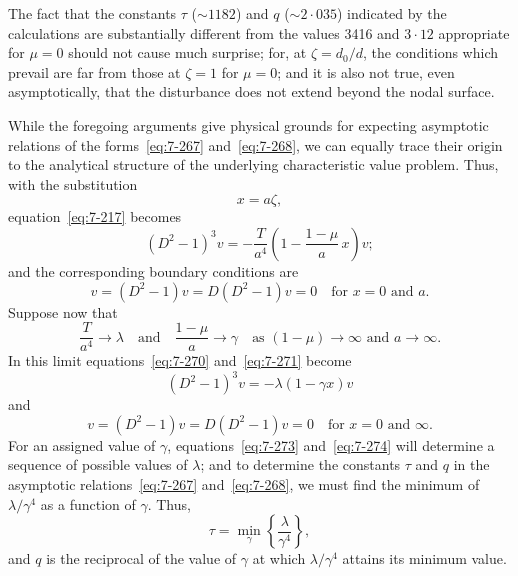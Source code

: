 The fact that the constants $\tau$ ($\sim 1182$) and $q$ ($\sim 2{\cdot}035$) indicated by
the calculations are substantially different from the values 3416 and
$3{\cdot}12$ appropriate for $\mu = 0$ should not cause much surprise; for, at
$\zeta = d_0/d$, the conditions which prevail are far from those at $\zeta = 1$ for
$\mu = 0$; and it is also not true, even asymptotically, that the disturbance
does not extend beyond the nodal surface.

While the foregoing arguments give physical grounds for expecting
asymptotic relations of the forms~\eqref{eq:7-267} and~\eqref{eq:7-268}, we can equally trace
their origin to the analytical structure of the underlying characteristic
value problem.  Thus, with the substitution
\begin{equation}
\label{eq:7-269}
x = a\zeta,
\end{equation}
equation~\eqref{eq:7-217} becomes
\begin{equation}
\label{eq:7-270}
(D^2-1)^3 v = -\frac{T}{a^4}\!\left(1-\frac{1-\mu}{a}\,x\right)v;
\end{equation}
and the corresponding boundary conditions are
\begin{equation}
\label{eq:7-271}
v = (D^2-1)v = D(D^2-1)v = 0
\quad \text{for } x = 0 \text{ and } a.
\end{equation}
Suppose now that
\begin{equation}
\label{eq:7-272}
\frac{T}{a^4} \to \lambda \quad \text{and} \quad
\frac{1-\mu}{a} \to \gamma \quad
\text{as } (1-\mu) \to \infty \text{ and } a \to \infty.
\end{equation}
In this limit equations~\eqref{eq:7-270} and~\eqref{eq:7-271} become
\begin{equation}
\label{eq:7-273}
(D^2-1)^3 v = -\lambda(1-\gamma x)v
\end{equation}
and
\begin{equation}
\label{eq:7-274}
v = (D^2-1)v = D(D^2-1)v = 0
\quad \text{for } x = 0 \text{ and } \infty.
\end{equation}
For an assigned value of $\gamma$, equations~\eqref{eq:7-273} and~\eqref{eq:7-274} will determine
a sequence of possible values of $\lambda$; and to determine the constants $\tau$
and $q$ in the asymptotic relations~\eqref{eq:7-267} and~\eqref{eq:7-268}, we must find the
minimum of $\lambda/\gamma^4$ as a function of $\gamma$.  Thus,
\begin{equation}
\label{eq:7-275}
\tau = \min_\gamma\!\left\{\frac{\lambda}{\gamma^4}\right\},
\end{equation}
and $q$ is the reciprocal of the value of $\gamma$ at which $\lambda/\gamma^4$ attains its minimum
value.

